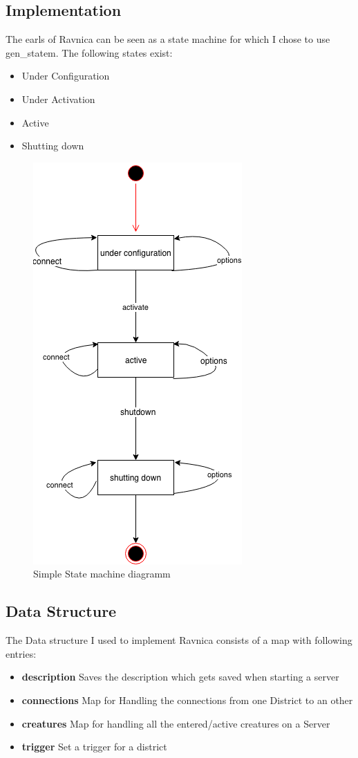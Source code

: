 \documentclass[12pt,a4paper]{article}
\begin{document}
\subsection{Implementation}
The earls of Ravnica can be seen as a state machine for which I chose to use gen\_statem.
The following states exist:
\begin{itemize}
	\item Under Configuration
	\item Under Activation
	\item Active
	\item Shutting down
\end{itemize}

\begin{figure}[!htb]
	\includegraphics{images/ravnica}
	\caption{Simple State machine diagramm}
\end{figure}

\subsection{Data Structure}
The Data structure I used to implement Ravnica consists of a map with following entries:
\begin{itemize}
	\item \textbf{description} Saves the description which gets saved when starting a server
	\item \textbf{connections} Map for Handling the connections from one District to an other
	\item \textbf{creatures} Map for handling all the entered/active creatures on a Server
	\item \textbf{trigger} Set a trigger for a district
\end{itemize}
\end{document}
